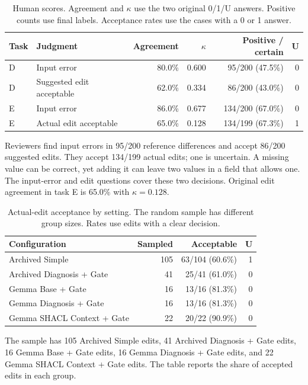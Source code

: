 \begin{table}[t]
\centering
\caption{Human scores. Agreement and $\kappa$ use the two original 0/1/U answers. Positive counts use final labels. Acceptance rates use the cases with a 0 or 1 answer.}
\label{tab:human_review}
\small
\begin{tabular}{llrrrr}
\toprule
Task & Judgment & Agreement & $\kappa$ & Positive / certain & U \\
\midrule
D & Input error & 80.0\% & 0.600 & 95/200 (47.5\%) & 0 \\
D & Suggested edit acceptable & 62.0\% & 0.334 & 86/200 (43.0\%) & 0 \\
E & Input error & 86.0\% & 0.677 & 134/200 (67.0\%) & 0 \\
E & Actual edit acceptable & 65.0\% & 0.128 & 134/199 (67.3\%) & 1 \\
\bottomrule
\end{tabular}
\end{table}

Reviewers find input errors in 95/200 reference differences and accept
86/200 suggested edits. They accept 134/199 actual edits; one is uncertain.
A missing value can be correct, yet adding it can leave two values in a
field that allows one. The input-error and edit questions cover these
two decisions. Original edit agreement in task E is 65.0\% with
$\kappa=0.128$.

\begin{table}[t]
\centering
\caption{Actual-edit acceptance by setting. The random sample has different group sizes. Rates use edits with a clear decision.}
\label{tab:human_review_by_config}
\small
\begin{tabular}{lrrr}
\toprule
Configuration & Sampled & Acceptable & U \\
\midrule
Archived Simple & 105 & 63/104 (60.6\%) & 1 \\
Archived Diagnosis + Gate & 41 & 25/41 (61.0\%) & 0 \\
Gemma Base + Gate & 16 & 13/16 (81.3\%) & 0 \\
Gemma Diagnosis + Gate & 16 & 13/16 (81.3\%) & 0 \\
Gemma SHACL Context + Gate & 22 & 20/22 (90.9\%) & 0 \\
\bottomrule
\end{tabular}
\end{table}

The sample has 105 Archived Simple edits, 41 Archived Diagnosis + Gate
edits, 16 Gemma Base + Gate edits, 16 Gemma Diagnosis + Gate edits,
and 22 Gemma SHACL Context + Gate edits.
The table reports the share of accepted edits in each group.

